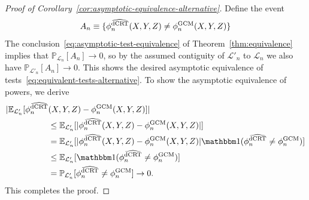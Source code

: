 \documentclass[aos]{imsart}
\theoremstyle{plain}
\theoremstyle{remark}
\newcommand{\E}{\mathbb E}								%
\renewcommand{\P}{\mathbb{P}}							%
\newcommand{\indicator}{\mathbbm 1}						%
\newcommand{\srx}{X}									%
\newcommand{\srz}{Z}									%
\newcommand{\sry}{Y}									%
\newcommand{\law}{\mathcal L}							%
\newcommand{\GCM}{\textnormal{GCM}}						%
\newcommand{\dCRThat}{\widehat{\textnormal{dCRT}}}		%
\begin{document}
\begin{proof}[Proof of Corollary~\ref{cor:asymptotic-equivalence-alternative}]
Define the event
$$
A_n \equiv \{\phi^{\dCRThat}_{n}(\srx, \sry, \srz) \neq \phi^{\GCM}_{n}(\srx, \sry, \srz)\}
$$
The conclusion~\eqref{eq:asymptotic-test-equivalence} of Theorem~\ref{thm:equivalence} implies that $\P_{\law_n}[A_n] \to 0$, so by the assumed contiguity of $\law'_n$ to $\law_n$ we also have $\P_{\law'_n}[A_n] \to 0$. This shows the desired asymptotic equivalence of tests~\eqref{eq:equivalent-tests-alternative}. To show the asymptotic equivalence of powers, we derive
\begin{align*}
|\E_{\law'_n}[\phi_n^{\dCRThat}&(\srx, \sry, \srz)-\phi_n^{\GCM}(\srx, \sry, \srz)]|
\\ &\leq
\E_{\law'_n}[|\phi_n^{\dCRThat}(\srx, \sry, \srz)-\phi_n^{\GCM}(\srx, \sry, \srz)|]\\
&= \E_{\law'_n}[|\phi_n^{\dCRThat}(\srx, \sry, \srz)-\phi_n^{\GCM}(\srx, \sry, \srz)|\indicator(\phi_n^{\dCRThat} \neq \phi_n^{\GCM})]\\
&\leq\E_{\law'_n}[\indicator(\phi_n^{\dCRThat} \neq \phi_n^{\GCM})]\\
&=\P_{\law'_n}[\phi_n^{\dCRThat} \neq \phi_n^{\GCM}] \to 0.
\end{align*}
This completes the proof.
\end{proof}
\end{document}
